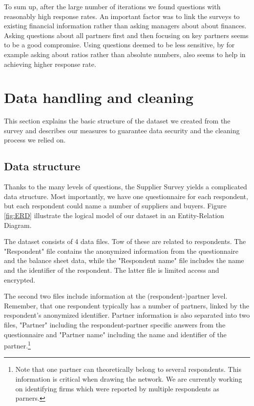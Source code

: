 \documentclass[final, dvipsnames, authoryear,12pt]{elsarticle}
\begin{document}
To sum up, after the large number of iterations we found questions with reasonably high response rates. An important factor was to link the surveys to existing financial information rather than asking managers about about finances. Asking questions about all partners first and then focusing on key partners seems to be a good compromise. Using questions deemed to be less sensitive, by for example asking about ratios rather than absolute numbers, also seems to help in achieving higher response rate. 

\section{Data handling and cleaning}
\label{sec:data_handling}

This section explains the basic structure of the dataset we created from the survey and describes our measures to guarantee data security and the cleaning process we relied on. 

\subsection{Data structure} 

Thanks to the many levels of questions, the Supplier Survey yields a complicated data structure. Most importantly, we have one questionnaire for each respondent, but each respondent could name a number of suppliers and buyers.  Figure \ref{fig:ERD} illustrate the logical model of our dataset in an Entity-Relation Diagram.



The dataset consists of 4 data files. Tow of these are related to respondents. The "Respondent" file contains the anonymized information from the questionnaire and the balance sheet data, while the "Respondent name" file includes the name and the identifier of the respondent. The latter file is limited access and encrypted. 

The second two files include information at the (respondent-)partner level. Remember, that one respondent typically has a number of partners, linked by the respondent's anonymized identifier. Partner information is also separated into two files, "Partner" including the respondent-partner specific answers from the questionnaire and "Partner name" including the name and identifier of the partner.\footnote{Note that one partner can theoretically belong to several respondents. This information is critical when drawing the network. We are currently working on identifying firms which were reported by multiple respondents as parners.}
\end{document}
